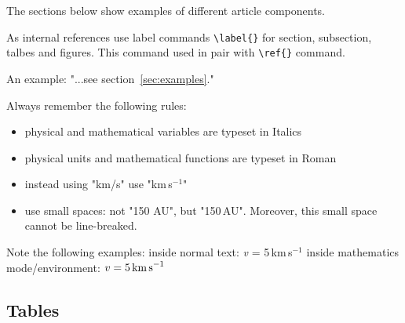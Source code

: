 \documentclass{caosp306}
\begin{document}
The sections below show examples of different article components.

As internal references use label commands \verb|\label{}| for section, subsection, talbes and figures. This command used in pair with \verb|\ref{}| command. 

An example: "...see section~\ref{sec:examples}."

Always remember the following rules:
\begin{itemize}
  \item physical and mathematical variables are typeset in Italics
  \item physical units and mathematical functions are typeset in Roman
  \item instead using "km/s" use "km\,s$^{-1}$"
  \item use small spaces: not "150 AU", but "150\,AU". Moreover, this small space cannot be line-breaked.
\end{itemize}

Note the following examples:
 inside normal text: {\it v} = 5\,km\,s$^{-1}$ 
 inside mathematics mode/environment: $ v = 5\,{\rm km\,s}^{-1}$ 


\subsection{Tables}
\end{document}

